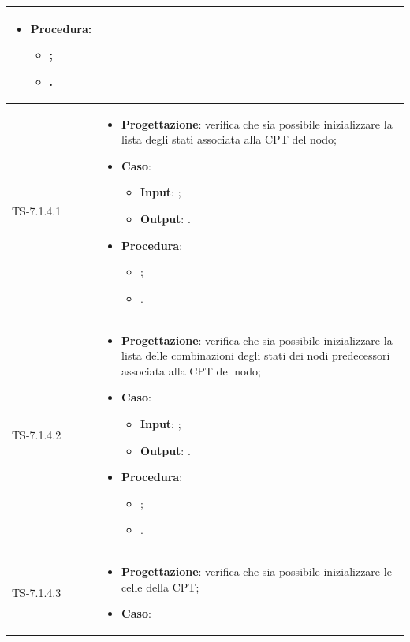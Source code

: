 \begin{longtable}{|C{2.5cm}|C{13cm}|}
\begin{itemize}
\begin{itemize}
	\end{itemize}
	\item \textbf{Procedura}:
	\begin{itemize}
		\item ;
		\item .
	\end{itemize} 
\end{itemize}
	  \\
	\hline
	{TS-7.1.4.1} &
\begin{itemize}
	\item \textbf{Progettazione}: verifica che sia possibile inizializzare la lista degli stati associata alla CPT del nodo;
	\item \textbf{Caso}: 
	\begin{itemize}
		\item \textbf{Input}: ;
		\item \textbf{Output}: .
	\end{itemize}
	\item \textbf{Procedura}:
	\begin{itemize}
		\item ;
		\item .
	\end{itemize} 
\end{itemize}
	  \\
	\hline
	{TS-7.1.4.2} &
\begin{itemize}
	\item \textbf{Progettazione}:  verifica che sia possibile inizializzare la lista delle combinazioni degli stati dei nodi
	predecessori associata alla CPT del nodo;
	\item \textbf{Caso}: 
	\begin{itemize}
		\item \textbf{Input}: ;
		\item \textbf{Output}: .
	\end{itemize}
	\item \textbf{Procedura}:
	\begin{itemize}
		\item ;
		\item .
	\end{itemize} 
\end{itemize}
	 \\
	\hline
	{TS-7.1.4.3} &
\begin{itemize}
	\item \textbf{Progettazione}:  verifica che sia possibile inizializzare le celle della CPT;
	\item \textbf{Caso}: 

\end{itemize}
\end{longtable}
